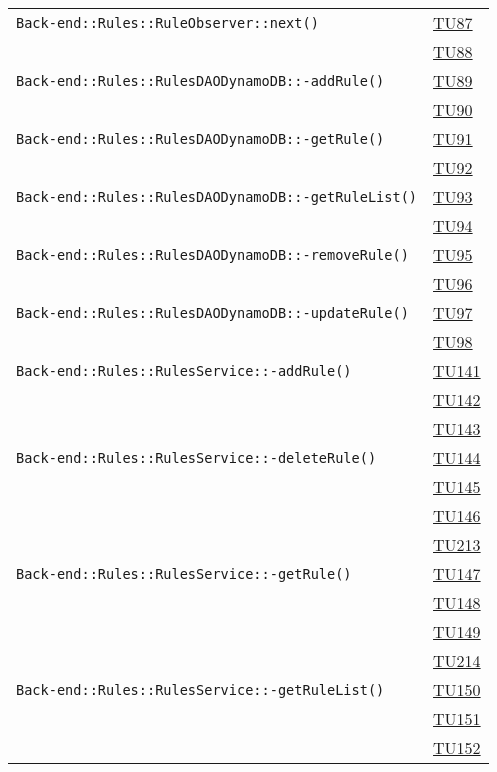 \begin{longtable}{|>{\centering}m{12cm}|m{1cm}<{\centering}|}
\texttt{Back-end::Rules::RuleObserver::next()} & \hyperlink{TU87}{TU87}\\ & \hyperlink{TU88}{TU88}\\ \hline
\texttt{Back-end::Rules::RulesDAODynamoDB::-\linebreak addRule()} & \hyperlink{TU89}{TU89}\\ & \hyperlink{TU90}{TU90}\\ \hline
\texttt{Back-end::Rules::RulesDAODynamoDB::-\linebreak getRule()} & \hyperlink{TU91}{TU91}\\ & \hyperlink{TU92}{TU92}\\ \hline
\texttt{Back-end::Rules::RulesDAODynamoDB::-\linebreak getRuleList()} & \hyperlink{TU93}{TU93}\\ & \hyperlink{TU94}{TU94}\\ \hline
\texttt{Back-end::Rules::RulesDAODynamoDB::-\linebreak removeRule()} & \hyperlink{TU95}{TU95}\\ & \hyperlink{TU96}{TU96}\\ \hline
\texttt{Back-end::Rules::RulesDAODynamoDB::-\linebreak updateRule()} & \hyperlink{TU97}{TU97}\\ & \hyperlink{TU98}{TU98}\\ \hline
\texttt{Back-end::Rules::RulesService::-\linebreak addRule()} & \hyperlink{TU141}{TU141}\\ & \hyperlink{TU142}{TU142}\\ & \hyperlink{TU143}{TU143}\\ \hline
\texttt{Back-end::Rules::RulesService::-\linebreak deleteRule()} & \hyperlink{TU144}{TU144}\\ & \hyperlink{TU145}{TU145}\\ & \hyperlink{TU146}{TU146}\\ & \hyperlink{TU213}{TU213}\\ \hline
\texttt{Back-end::Rules::RulesService::-\linebreak getRule()} & \hyperlink{TU147}{TU147}\\ & \hyperlink{TU148}{TU148}\\ & \hyperlink{TU149}{TU149}\\ & \hyperlink{TU214}{TU214}\\ \hline
\texttt{Back-end::Rules::RulesService::-\linebreak getRuleList()} & \hyperlink{TU150}{TU150}\\ & \hyperlink{TU151}{TU151}\\ & \hyperlink{TU152}{TU152}\\ \hline

\end{longtable}

